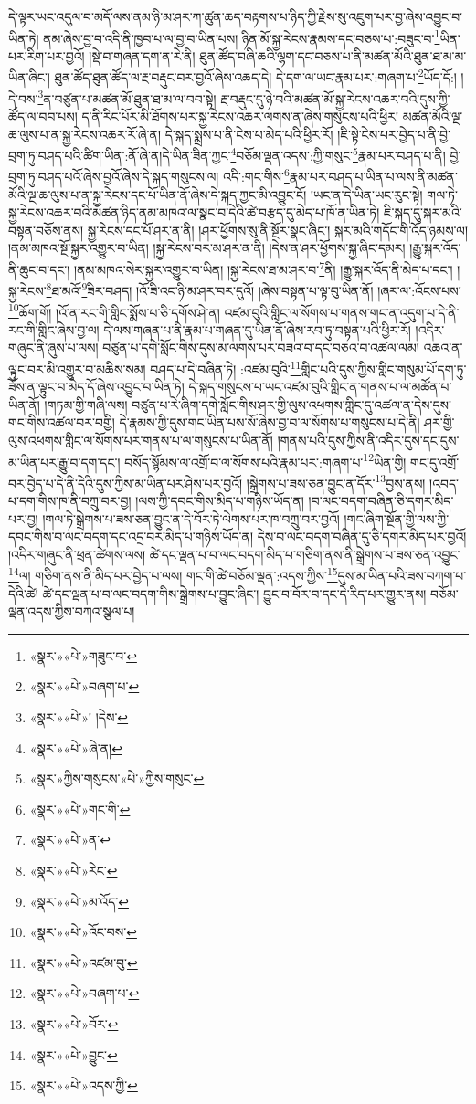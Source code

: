 དེ་ལྟར་ཡང་འདུལ་བ་མདོ་ལས་ནམ་ཉི་མ་ཤར་ཀ་ཚུན་ཆད་བརྟགས་པ་ཉིད་ཀྱི་རྗེས་སུ་འཇུག་པར་བྱ་ཞེས་འབྱུང་བ་ཡིན་ཏེ། ནམ་ཞེས་བྱ་བ་འདི་ནི་ཁྱབ་པ་ལ་བྱ་བ་ཡིན་པས། ཉིན་མོ་སྐྱ་རེངས་རྣམས་དང་བཅས་པ་:བཟུང་བ་\footnote{«སྣར་»«པེ་»གཟུང་བ་}ཡིན་པར་རིག་པར་བྱའོ། །སྡེ་བ་གཞན་དག་ན་རེ་ནི། ཐུན་ཚོད་བཞི་ཆའི་ལྷག་དང་བཅས་པ་ནི་མཚན་མོའི་ཐུན་ཐ་མ་མ་ཡིན་ཞིང་། ཐུན་ཚོད་ཐུན་ཚོད་ལ་རྔ་བརྡུང་བར་བྱའོ་ཞེས་འཆད་དེ། དེ་དག་ལ་ཡང་རྣམ་པར་:གཞག་པ་\footnote{«སྣར་»«པེ་»བཞག་པ་}ཡོད་དོ:། །དེ་བས་\footnote{«སྣར་»«པེ་»། །དེས་}ན་བཙུན་པ་མཚན་མོ་ཐུན་ཐ་མ་ལ་བབ་སྟེ། རྔ་བརྡུང་དུ་ཉེ་བའི་མཚན་མོ་སྐྱ་རེངས་འཆར་བའི་དུས་ཀྱི་ཚོད་ལ་བབ་པས། ད་ནི་རིང་པོར་མི་ཐོགས་པར་སྐྱ་རེངས་འཆར་ལགས་ན་ཞེས་གསུངས་པའི་ཕྱིར། མཚན་མོའི་ལྔ་ཆ་ལུས་པ་ན་སྐྱ་རེངས་འཆར་རོ་ཞེ་ན། དེ་སྐད་སྨྲས་པ་ནི་ངེས་པ་མེད་པའི་ཕྱིར་རོ། །ཇི་སྟེ་ངེས་པར་བྱེད་པ་ནི་བྱེ་བྲག་ཏུ་བཤད་པའི་ཚིག་ཡིན་:ནོ་ཞེ་ན།དེ་ཡིན་ཟིན་ཀྱང་\footnote{«སྣར་»«པེ་»ཞེ་ན།}བཅོམ་ལྡན་འདས་:ཀྱི་གསུང་\footnote{«སྣར་»ཀྱིས་གསུངས་«པེ་»ཀྱིས་གསུང་}རྣམ་པར་བཤད་པ་ནི། བྱེ་བྲག་ཏུ་བཤད་པའོ་ཞེས་བྱའོ་ཞེས་དེ་སྐད་གསུངས་ལ། འདི་:གང་གིས་\footnote{«སྣར་»«པེ་»གང་གི་}རྣམ་པར་བཤད་པ་ཡིན་པ་ལས་ནི་མཚན་མོའི་ལྔ་ཆ་ལུས་པ་ན་སྐྱ་རེངས་དང་པོ་ཡིན་ནོ་ཞེས་དེ་སྐད་ཀྱང་མི་འབྱུང་ངོ། །ཡང་ན་དེ་ཡིན་ཡང་རུང་སྟེ། གལ་ཏེ་སྐྱ་རེངས་འཆར་བའི་མཚན་ཉིད་ནམ་མཁའ་ལ་སྣང་བ་དེའི་ཚེ་བརྩད་དུ་མེད་པ་ཁོ་ན་ཡིན་ཏེ། ཇི་སྐད་དུ་སྐར་མའི་བསྟན་བཅོས་ནས། སྐྱ་རེངས་དང་པོ་ཤར་ན་ནི། །ཤར་ཕྱོགས་སུ་ནི་སྔོར་སྣང་ཞིང་། སྐར་མའི་གདོང་གི་འོད་ཉམས་ལ། །ནམ་མཁའ་སྔོ་སྐྱར་འགྱུར་བ་ཡིན། །སྐྱ་རེངས་བར་མ་ཤར་ན་ནི། །དེས་ན་ཤར་ཕྱོགས་སྐྱ་ཞིང་དམར། །རྒྱུ་སྐར་འོད་ནི་ཆུང་བ་དང་། །ནམ་མཁའ་སེར་སྐྱར་འགྱུར་བ་ཡིན། །སྐྱ་རེངས་ཐ་མ་ཤར་བ་\footnote{«སྣར་»«པེ་»ན་}ནི། །རྒྱུ་སྐར་འོད་ནི་མེད་པ་དང་། །སྐྱ་རེངས་\footnote{«སྣར་»«པེ་»རེང་}ཐ་མའོ་\footnote{«སྣར་»«པེ་»མ་འོད་}ཟིར་བཤད། །འོ་ཟི་འང་ཉི་མ་ཤར་བར་དུའོ། །ཞེས་བསྟན་པ་ལྟ་བུ་ཡིན་ནོ། །ཞར་ལ་:འོངས་པས་\footnote{«སྣར་»«པེ་»འོང་བས་}ཆོག་གོ། །འོ་ན་རང་གི་གླིང་སྨོས་པ་ཅི་དགོས་ཤེ་ན། འཛམ་བུའི་གླིང་ལ་སོགས་པ་གནས་གང་ན་འདུག་པ་དེ་ནི་རང་གི་གླིང་ཞེས་བྱ་ལ། དེ་ལས་གཞན་པ་ནི་རྣམ་པ་གཞན་དུ་ཡིན་ནོ་ཞེས་རབ་ཏུ་བསྟན་པའི་ཕྱིར་རོ། །འདིར་གཞུང་ནི་ཞུས་པ་ལས། བཙུན་པ་དགེ་སློང་གིས་དུས་མ་ལགས་པར་བཟའ་བ་དང་བཅའ་བ་འཚལ་ལམ། འཆའ་ན་ལྟུང་བར་མི་འགྱུར་བ་མཆིས་སམ། བཤད་པ་དེ་བཞིན་ཏེ། :འཛམ་བུའི་\footnote{«སྣར་»«པེ་»འཛམ་བུ་}གླིང་པའི་དུས་ཀྱིས་གླིང་གསུམ་པོ་དག་ཏུ་ཟོས་ན་ལྟུང་བ་མེད་དོ་ཞེས་འབྱུང་བ་ཡིན་ཏེ། དེ་སྐད་གསུངས་པ་ཡང་འཛམ་བུའི་གླིང་ན་གནས་པ་ལ་མཚོན་པ་ཡིན་ནོ། །གཏམ་གྱི་གཞི་ལས། བཙུན་པ་རེ་ཞིག་དགེ་སློང་གིས་ཤར་གྱི་ལུས་འཕགས་གླིང་དུ་འཚལ་ན་དེས་དུས་གང་གིས་འཚལ་བར་བགྱི། དེ་རྣམས་ཀྱི་དུས་གང་ཡིན་པས་སོ་ཞེས་བྱ་བ་ལ་སོགས་པ་གསུངས་པ་དེ་ནི། ཤར་གྱི་ལུས་འཕགས་གླིང་ལ་སོགས་པར་གནས་པ་ལ་གསུངས་པ་ཡིན་ནོ། །གནས་པའི་དུས་ཀྱིས་ནི་འདིར་དུས་དང་དུས་མ་ཡིན་པར་རྒྱུ་བ་དག་དང་། བསོད་སྙོམས་ལ་འགྲོ་བ་ལ་སོགས་པའི་རྣམ་པར་:གཞག་པ་\footnote{«སྣར་»«པེ་»བཞག་པ་}ཡིན་གྱི། གང་དུ་འགྲོ་བར་བྱེད་པ་དེ་ནི་དེའི་དུས་ཀྱིས་མ་ཡིན་པར་ཤེས་པར་བྱའོ། །སྒྲེགས་པ་ཟས་ཅན་བྱུང་ན་དོར་\footnote{«སྣར་»«པེ་»བོར་}བྱས་ནས། །འབད་པ་དག་གིས་ཁ་ནི་བཀྲུ་བར་བྱ། །ལས་ཀྱི་དབང་གིས་མིད་པ་གཉིས་ཡོད་ན། །བ་ལང་བདག་བཞིན་ཅི་དགར་མིད་པར་བྱ། །གལ་ཏེ་སྒྲེགས་པ་ཟས་ཅན་བྱུང་ན་དེ་བོར་ཏེ་ལེགས་པར་ཁ་བཀྲུ་བར་བྱའོ། །གང་ཞིག་སྔོན་གྱི་ལས་ཀྱི་དབང་གིས་བ་ལང་བདག་དང་འདྲ་བར་མིད་པ་གཉིས་ཡོད་ན། དེས་བ་ལང་བདག་བཞིན་དུ་ཅི་དགར་མིད་པར་བྱའོ། །འདིར་གཞུང་ནི་ཕྲན་ཚེགས་ལས། ཚེ་དང་ལྡན་པ་བ་ལང་བདག་མིད་པ་གཅིག་ནས་ནི་སྒྲེགས་པ་ཟས་ཅན་འབྱུང་\footnote{«སྣར་»«པེ་»བྱུང་}ལ། གཅིག་ནས་ནི་མིད་པར་བྱེད་པ་ལས། གང་གི་ཚེ་བཅོམ་ལྡན་:འདས་ཀྱིས་\footnote{«སྣར་»«པེ་»འདས་ཀྱི་}དུས་མ་ཡིན་པའི་ཟས་བཀག་པ་དེའི་ཚེ། ཚེ་དང་ལྡན་པ་བ་ལང་བདག་གིས་སྒྲེགས་པ་བྱུང་ཞིང་། བྱུང་བ་བོར་བ་དང་དེ་རིད་པར་གྱུར་ནས། བཅོམ་ལྡན་འདས་ཀྱིས་བཀའ་སྩལ་པ། 